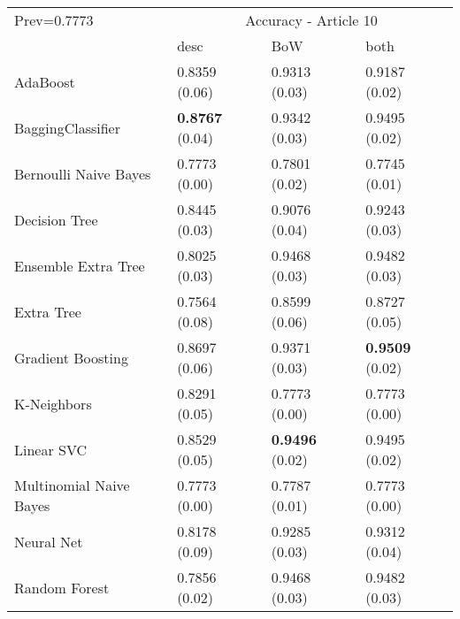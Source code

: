\begin{tabular}{|l|l|l|l| }
\hline
Prev=0.7773 &  \multicolumn{3}{c|}{Accuracy - Article 10} \\
\cline{2-4} & desc & BoW & both \\ \hline
AdaBoost                & 0.8359 (0.06) & 0.9313 (0.03) & 0.9187 (0.02)\\
BaggingClassifier       & {\bf 0.8767} (0.04) & 0.9342 (0.03) & 0.9495 (0.02)\\
Bernoulli Naive Bayes   & 0.7773 (0.00) & 0.7801 (0.02) & 0.7745 (0.01)\\
Decision Tree           & 0.8445 (0.03) & 0.9076 (0.04) & 0.9243 (0.03)\\
Ensemble Extra Tree     & 0.8025 (0.03) & 0.9468 (0.03) & 0.9482 (0.03)\\
Extra Tree              & 0.7564 (0.08) & 0.8599 (0.06) & 0.8727 (0.05)\\
Gradient Boosting       & 0.8697 (0.06) & 0.9371 (0.03) & {\bf 0.9509} (0.02)\\
K-Neighbors             & 0.8291 (0.05) & 0.7773 (0.00) & 0.7773 (0.00)\\
Linear SVC              & 0.8529 (0.05) & {\bf 0.9496} (0.02) & 0.9495 (0.02)\\
Multinomial Naive Bayes & 0.7773 (0.00) & 0.7787 (0.01) & 0.7773 (0.00)\\
Neural Net              & 0.8178 (0.09) & 0.9285 (0.03) & 0.9312 (0.04)\\
Random Forest           & 0.7856 (0.02) & 0.9468 (0.03) & 0.9482 (0.03)\\
\hline
\end{tabular}